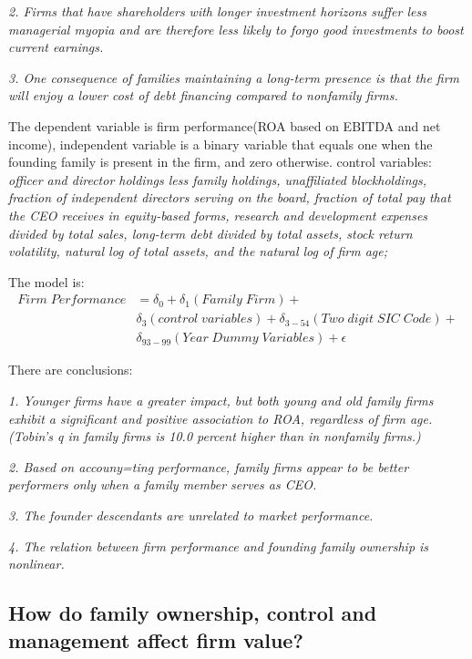 \documentclass{article}
\begin{document}
    \emph{2. Firms that have shareholders with longer investment horizons suffer less managerial myopia and are therefore less likely to forgo good investments to boost current earnings.}

    \emph{3. One consequence of families maintaining a long-term presence is that the firm will enjoy a lower cost of debt financing compared to nonfamily firms.}

    The dependent variable is firm performance(ROA based on EBITDA and net income), independent variable
    is a binary variable that equals one when the founding family is present in the firm, and zero otherwise.
    control variables:
    \emph{officer and director holdings less family holdings, unaffiliated blockholdings, fraction of independent directors serving on the board, 
    fraction of total pay that the CEO receives in equity-based forms, research and development expenses divided by total sales, long-term debt divided by total assets, 
    stock return volatility, natural log of total assets, and the natural log of firm age;
    }

    The model is:
    \begin{equation}
        \begin{aligned}
            Firm \; Performance&=\delta_0+\delta_1(Family\; Firm)+\\
            &\delta_3(control\; variables)+\delta_{3-54}(Two\; digit\; SIC\; Code)+ \\
            &\delta_{93-99}(Year\; Dummy\; Variables)+\epsilon
        \end{aligned}
    \end{equation}

    There are conclusions:

    \emph{1. Younger firms have a greater impact, but both young and old family firms exhibit a significant and positive association to ROA, regardless of firm age.
    (Tobin's q in family firms is 10.0 percent higher than in nonfamily firms.)}

    \emph{2. Based on accouny=ting performance, family firms appear to be better performers only when a family member serves as CEO.}

    \emph{3. The founder descendants are unrelated to market performance.}

    \emph{4. The relation between firm performance and founding family ownership is nonlinear.}

\subsection{How do family ownership, control and management affect firm value?}
    ~\
    
\end{document}

